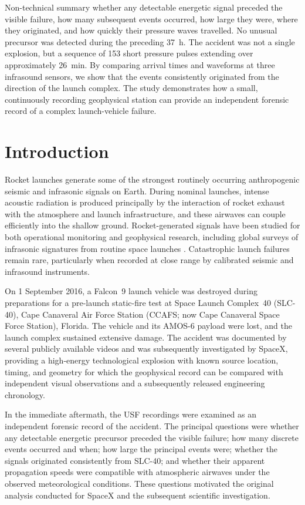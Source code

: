 \documentclass[]{seismica}
\begin{document}
{\begin{summary}{Non-technical summary}
  whether any detectable energetic signal preceded the visible failure, how
  many subsequent events occurred, how large they were, where they originated,
  and how quickly their pressure waves travelled. No unusual precursor was
  detected during the preceding \SI{37}{\hour}. The accident was not a single
  explosion, but a sequence of 153 short pressure pulses extending over
  approximately \SI{26}{\minute}. By comparing arrival times and waveforms at
  three infrasound sensors, we show that the events consistently originated
  from the direction of the launch complex. The study demonstrates how a
  small, continuously recording geophysical station can provide an independent
  forensic record of a complex launch-vehicle failure.
  \end{summary}
}


\section{Introduction}
\label{sec:introduction}

Rocket launches generate some of the strongest routinely occurring
anthropogenic seismic and infrasonic signals on Earth. During nominal launches,
intense acoustic radiation is produced principally by the interaction of rocket
exhaust with the atmosphere and launch infrastructure, and these airwaves can
couple efficiently into the shallow ground. Rocket-generated signals have been
studied for both operational monitoring and geophysical research, including
global surveys of infrasonic signatures from routine space launches
\citep{pilger_rocket_2021}. Catastrophic launch failures remain rare,
particularly when recorded at close range by calibrated seismic and infrasound
instruments.

On 1 September 2016, a Falcon~9 launch vehicle was destroyed during
preparations for a pre-launch static-fire test at Space Launch Complex~40
(SLC-40), Cape Canaveral Air Force Station (CCAFS; now Cape Canaveral Space
Force Station), Florida. The vehicle and its AMOS-6 payload were lost, and the
launch complex sustained extensive damage. The accident was documented by
several publicly available videos and was subsequently investigated by SpaceX,
providing a high-energy technological explosion with known source location,
timing, and geometry for which the geophysical record can be compared with
independent visual observations and a subsequently released engineering
chronology.

In the immediate aftermath, the USF recordings were examined as an independent
forensic record of the accident. The principal questions were whether any
detectable energetic precursor preceded the visible failure; how many discrete
events occurred and when; how large the principal events were; whether the
signals originated consistently from SLC-40; and whether their apparent
propagation speeds were compatible with atmospheric airwaves under the observed
meteorological conditions. These questions motivated the original analysis
conducted for SpaceX and the subsequent scientific investigation.
\end{document}
